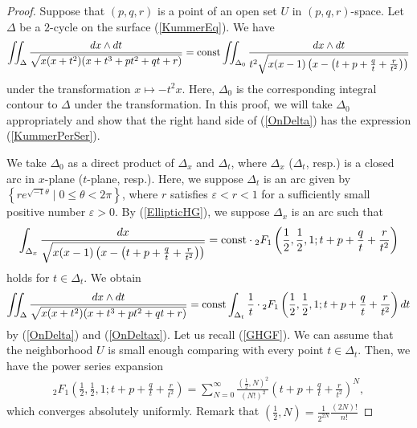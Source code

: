 \documentclass[10pt]{article}
\begin{document}
\begin{proof}
Suppose that $(p,q,r)$ is a point of an open set $U$ in $(p,q,r)$-space.
Let $\Delta$ be a $2$-cycle on the surface (\ref{KummerEq}).
We have 
\begin{align}\label{OnDelta}
\iint_\Delta \frac{dx \wedge dt}{\sqrt{x(x+t^2)(x+t^3 +p t^2 +q t +r)}} 
={\rm const} \iint_{\Delta_0} \frac{dx \wedge dt}{t^2 \sqrt{x(x-1)\left(x-\left(t+p+\frac{q}{t} +\frac{r}{t^2}\right)\right)}} 
\end{align}
under the transformation $x\mapsto -t^2 x$. 
Here, $\Delta_0$ is the corresponding integral contour to $\Delta$ under the transformation.
In this proof, we will take $\Delta_0$ appropriately and show that the right hand side of (\ref{OnDelta}) has the expression (\ref{KummerPerSer}).
 
We take  $\Delta_0$ as a direct product of $\Delta_x$ and $\Delta_t$,
where $\Delta_x$ ($\Delta_t$, resp.) is a closed arc in $x$-plane ($t$-plane, resp.).
Here, we suppose $\Delta_t$ is an arc given by
$\left\{r e^{\sqrt{-1} \theta} \mid 0\leq \theta <2 \pi \right\}$,
where $r$ satisfies $\varepsilon<r<1$ for a sufficiently small positive number $\varepsilon>0$. 
 By (\ref{EllipticHG}),
 we suppose $\Delta_x$ is an arc such that
\begin{align}\label{OnDeltax}
\int_{\Delta_x} \frac{dx}{\sqrt{x(x-1)\left(x-\left(t+p+\frac{q}{t} +\frac{r}{t^2}\right)\right)}} = {\rm const} \cdot {}_2 F_1 \left(\frac{1}{2},\frac{1}{2},1 ; t+p+\frac{q}{t}+\frac{r}{t^2} \right)
\end{align}
holds for  $t\in \Delta_t$.
We obtain
\begin{align}\label{PResidue}
\iint_\Delta \frac{dx \wedge dt}{\sqrt{x(x+t^2)(x+t^3 +p t^2 +q t +r)}} 
={\rm const} \int_{\Delta_t} \frac{1}{t} \cdot {}_2F_1 \left(\frac{1}{2},\frac{1}{2},1 ; t+p+\frac{q}{t}+\frac{r}{t^2} \right) dt
\end{align}
by (\ref{OnDelta}) and (\ref{OnDeltax}).
Let us recall (\ref{GHGF}).  
We can assume that the neighborhood $U$ is  small enough comparing with every point $t\in \Delta_t$.
Then, we have the power series expansion
\begin{align}\label{SGHGF}
{}_2F_1 \left(\frac{1}{2},\frac{1}{2},1 ; t+p+\frac{q}{t}+\frac{r}{t^2} \right) 
=\sum_{N=0}^\infty \frac{(\frac{1}{2},N)^2}{(N!)^2} \left( t+p+\frac{q}{t}+\frac{r}{t^2} \right)^N,
\end{align}
which converges absolutely uniformly.
Remark that
$\displaystyle \left(\frac{1}{2},N\right) =\frac{1}{2^{2N}} \frac{(2N)!}{n!}$

\end{proof}
\end{document}

